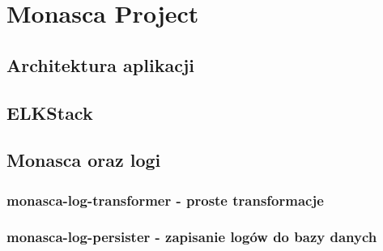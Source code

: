 \chapter[Przykładowa aplikacja]{Monasca Project}
\label{chapter:monasca}

\section{Architektura aplikacji}
\section{ELKStack}
\section{Monasca oraz logi}
\clearpage 
\clearpage 
\subsection{monasca-log-transformer - proste transformacje}
\subsection{monasca-log-persister - zapisanie logów do bazy danych}